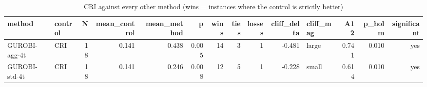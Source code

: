 \begin{table}[htbp]
\centering
\small
\caption{CRI against every other method (wins = instances where the control is strictly better)}
\label{tab:E7_gurobi_threads_b60_vs_CRI}
\begin{tabular}{llrrrrrrrrlrrr}
\toprule
method & control & N & mean\_control & mean\_method & p & wins & ties & losses & cliff\_delta & cliff\_mag & A12 & p\_holm & significant \\
\midrule
GUROBI-agg-4t & CRI & 18 & 0.141 & 0.438 & 0.005 & 14 & 3 & 1 & -0.481 & large & 0.741 & 0.010 & yes \\
GUROBI-std-4t & CRI & 18 & 0.141 & 0.246 & 0.008 & 12 & 5 & 1 & -0.228 & small & 0.614 & 0.010 & yes \\
\bottomrule
\end{tabular}
\end{table}
